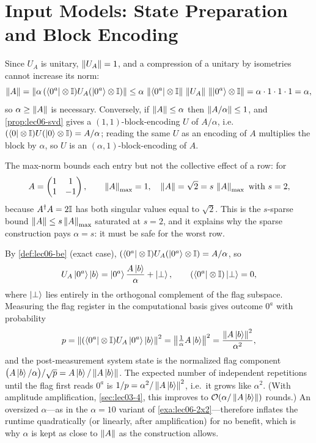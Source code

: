 \chapter{Input Models: State Preparation and Block Encoding}

\begin{solution}
Since $U_A$ is unitary, $\left\lVert U_A \right\rVert=1$, and a compression of a unitary by isometries
cannot increase its norm:
\[
  \left\lVert A \right\rVert=\left\lVert \alpha\,(\bra{0^a}\otimes\mathbb{I})U_A(\ket{0^a}\otimes\mathbb{I}) \right\rVert
  \le\alpha\,\left\lVert \bra{0^a}\otimes\mathbb{I} \right\rVert\,\left\lVert U_A \right\rVert\,\left\lVert \ket{0^a}\otimes\mathbb{I} \right\rVert
  =\alpha\cdot1\cdot1\cdot1=\alpha,
\]
so $\alpha\ge\left\lVert A \right\rVert$ is necessary. Conversely, if $\left\lVert A \right\rVert\le\alpha$ then
$\left\lVert A/\alpha \right\rVert\le1$, and \cref{prop:lec06-svd} gives a $(1,1)$-block-encoding
$U$ of $A/\alpha$, i.e.\ $(\bra{0}\otimes\mathbb{I})U(\ket{0}\otimes\mathbb{I})=A/\alpha$; reading
the same $U$ as an encoding of $A$ multiplies the block by $\alpha$, so $U$ is an
$(\alpha,1)$-block-encoding of $A$.

The max-norm bounds each entry but not the collective effect of a row: for
\[
  A=\begin{pmatrix}1&1\\1&-1\end{pmatrix},\qquad \left\lVert A \right\rVert_{\max}=1,\quad
  \left\lVert A \right\rVert=\sqrt2=s\,\left\lVert A \right\rVert_{\max}\text{ with }s=2,
\]
because $A^{\dagger} A=2\mathbb{I}$ has both singular values equal to $\sqrt2$. This is the
$s$-sparse bound $\left\lVert A \right\rVert\le s\left\lVert A \right\rVert_{\max}$ saturated at $s=2$, and it explains
why the sparse construction pays $\alpha=s$: it must be safe for the worst row.
\end{solution}

\begin{solution}
By \cref{def:lec06-be} (exact case), $(\bra{0^a}\otimes\mathbb{I})U_A(\ket{0^a}\otimes\mathbb{I})
=A/\alpha$, so
\[
  U_A\ket{0^a}\ket{b}=\ket{0^a}\frac{A\ket{b}}{\alpha}+\ket{\perp},
  \qquad (\bra{0^a}\otimes\mathbb{I})\ket{\perp}=0,
\]
where $\ket{\perp}$ lies entirely in the orthogonal complement of the flag
subspace. Measuring the flag register in the computational basis gives outcome
$0^a$ with probability
\[
  p=\left\lVert (\bra{0^a}\otimes\mathbb{I})U_A\ket{0^a}\ket{b} \right\rVert^2
   =\left\lVert \tfrac1\alpha A\ket{b} \right\rVert^2=\frac{\left\lVert A\ket{b} \right\rVert^2}{\alpha^2},
\]
and the post-measurement system state is the normalized flag component
$\bigl(A\ket{b}/\alpha\bigr)/\sqrt{p}=A\ket{b}/\left\lVert A\ket{b} \right\rVert$. The expected number
of independent repetitions until the flag first reads $0^a$ is $1/p=
\alpha^2/\left\lVert A\ket{b} \right\rVert^2$, i.e.\ it grows like $\alpha^2$. (With amplitude
amplification, \cref{sec:lec03-4}, this improves to $\mathcal{O}(\alpha/\left\lVert A\ket{b} \right\rVert)$
rounds.) An oversized $\alpha$---as in the $\alpha=10$ variant of
\cref{exa:lec06-2x2}---therefore inflates the runtime quadratically (or linearly,
after amplification) for no benefit, which is why $\alpha$ is kept as close to
$\left\lVert A \right\rVert$ as the construction allows.
\end{solution}

